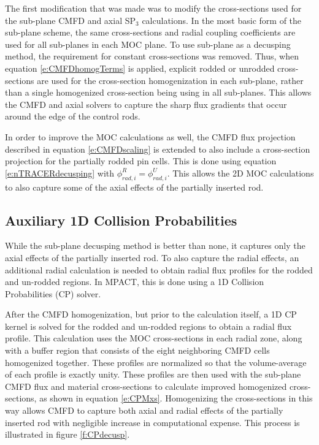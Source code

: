 The first modification that was made was to modify the cross-sections used for the sub-plane CMFD and axial SP$_3$ calculations.  In the most basic form of the sub-plane scheme, the same cross-sections and radial coupling coefficients are used for all sub-planes in each MOC plane.  To use sub-plane as a decusping method, the requirement for constant cross-sections was removed.  Thus, when equation \ref{e:CMFDhomogTerms} is applied, explicit rodded or unrodded cross-sections are used for the cross-section homogenization in each sub-plane, rather than a single homogenized cross-section being using in all sub-planes.  This allows the CMFD and axial solvers to capture the sharp flux gradients that occur around the edge of the control rods.

In order to improve the MOC calculations as well, the CMFD flux projection described in equation \ref{e:CMFDscaling} is extended to also include a cross-section projection for the partially rodded pin cells.  This is done using equation \ref{e:nTRACERdecusping} with $\phi_{rad,i}^R = \phi_{rad,i}^U$.  This allows the 2D MOC calculations to also capture some of the axial effects of the partially inserted rod.

\subsection{Auxiliary 1D Collision Probabilities}

While the sub-plane decusping method is better than none, it captures only the axial effects of the partially inserted rod.  To also capture the radial effects, an additional radial calculation is needed to obtain radial flux profiles for the rodded and un-rodded regions.  In MPACT, this is done using a 1D Collision Probabilities (CP) solver.

After the CMFD homogenization, but prior to the calculation itself, a 1D CP kernel is solved for the rodded and un-rodded regions to obtain a radial flux profile.  This calculation uses the MOC cross-sections in each radial zone, along with a buffer region that consists of the eight neighboring CMFD cells homogenized together.  These profiles are normalized so that the volume-average of each profile is exactly unity.  These profiles are then used with the sub-plane CMFD flux and material cross-sections to calculate improved homogenized cross-sections, as shown in equation \ref{e:CPMxs}.  Homogenizing the cross-sections in this way allows CMFD to capture both axial and radial effects of the partially inserted rod with negligible increase in computational expense.  This process is illustrated in figure \ref{f:CPdecusp}.

